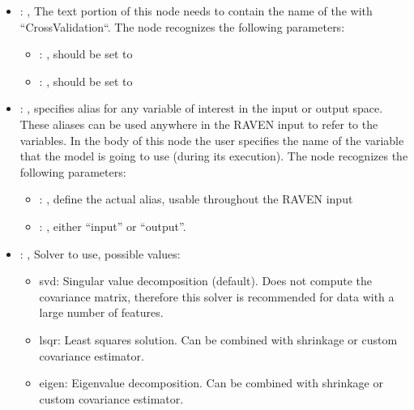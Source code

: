 \begin{itemize}
    \item {}: , 
      The text portion of this node needs to contain the name of the  with
               ``CrossValidation``.
      The  node recognizes the following parameters:
        \begin{itemize}
          \item {}: , 
            should be set to 
          \item {}: , 
            should be set to 
      \end{itemize}

    \item {}: , 
      specifies alias for         any variable of interest in the input or output space. These
      aliases can be used anywhere in the RAVEN input to         refer to the variables. In the body
      of this node the user specifies the name of the variable that the model is going to use
      (during its execution).
      The  node recognizes the following parameters:
        \begin{itemize}
          \item {}: , 
            define the actual alias, usable throughout the RAVEN input
          \item {}: , 
            either ``input'' or ``output''.
      \end{itemize}

    \item {}: , 
      Solver to use, possible values:
      \begin{itemize}                                                    \item svd: Singular value
      decomposition (default). Does not compute the covariance matrix,
      therefore this solver is recommended for data with a large number of features.
      \item lsqr: Least squares solution. Can be combined with shrinkage or custom covariance
      estimator.                                                    \item eigen: Eigenvalue
      decomposition. Can be combined with shrinkage or custom covariance estimator.
      \end{itemize}


\end{itemize}
